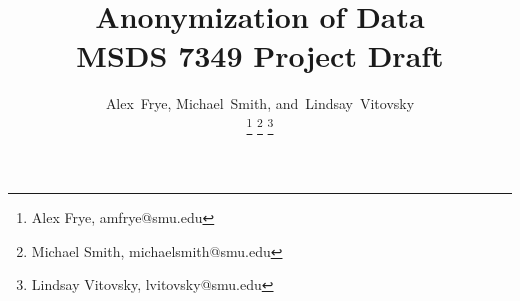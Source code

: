 \documentclass[10pt,journal,compsoc]{IEEEtran}
\begin{document}
%
\title{Anonymization of Data\\MSDS 7349 Project Draft}
%
%
%
%

\author{Alex~Frye,
        Michael~Smith,
        and~Lindsay~Vitovsky%
\protect\\

\thanks{Alex Frye, amfrye@smu.edu} \thanks{Michael Smith, michaelsmith@smu.edu} \thanks {Lindsay Vitovsky, lvitovsky@smu.edu}}
\end{document}
